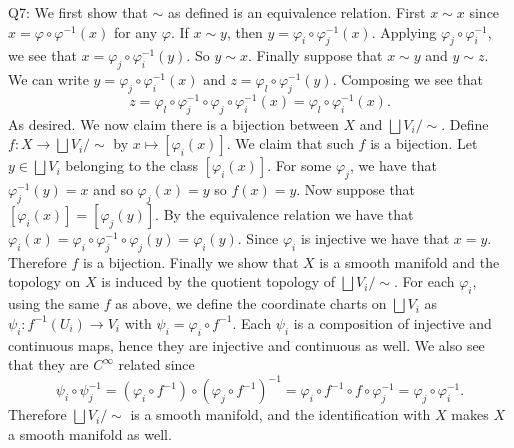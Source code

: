 \documentclass[letterpaper]{article}
\begin{document}
 
\noindent Q7: We first show that $\sim$ as defined is an equivalence relation. First $x \sim x$ since $x = \varphi \circ \varphi^{-1}(x)$ for any $\varphi$. 
If $x \sim y$, then $y = \varphi_i \circ \varphi_j^{-1} (x)$. Applying $\varphi_j \circ \varphi_i^{-1}$, we see that $x = \varphi_{j}  \circ \varphi_i^{-1}(y)$. So $y \sim x$. 
Finally suppose that $x \sim y$ and $y \sim z$. We can write $ y = \varphi_j \circ \varphi_i^{-1}(x)$ and $z = \varphi_l \circ \varphi_j^{-1}(y).$ Composing we see that
 $$z = \varphi_l \circ \varphi_j^{-1} \circ \varphi_j \circ \varphi_i^{-1}(x) = \varphi_l \circ \varphi_i^{-1}(x).$$ 
As desired. We now claim there is a bijection between $X$ and $\bigsqcup V_i / \sim$. Define $f: X \to \bigsqcup V_i / \sim$ by $x \mapsto [\varphi_i(x)]$. We claim that such $f$ is a bijection. 
Let $y \in \bigsqcup V_i$ belonging to the class $[\varphi_i(x)]$. For some $\varphi_j$, we have that $\varphi_j^{-1}(y) = x$ and so $\varphi_j(x) = y$ so $f(x) = y$. 
Now suppose that $[\varphi_i(x)] = [\varphi_j(y)]$. By the equivalence relation we have that $\varphi_i(x) = \varphi_i\circ\varphi_j^{-1}  \circ \varphi_j (y)= \varphi_i(y). $ Since $\varphi_i$ is injective we have that $x = y$. 
Therefore $f$ is a bijection. Finally we show that $X$ is a smooth manifold and the topology on $X$ is induced by
the quotient topology of $\bigsqcup V_i / \sim$. For each $\varphi_i$, using the same $f$ as above, we define the coordinate charts on $\bigsqcup V_i$ as $\psi_i: f^{-1}(U_i) \to V_i$ with $\psi_i = \varphi_i \circ f^{-1}$. Each $\psi_i$ is a composition of injective and continuous maps, 
hence they are injective and continuous as well. We also see that they are $C^\infty$ related since 
$$\psi_i \circ \psi_j^{-1} = (\varphi_i \circ f^{-1}) \circ (\varphi_j \circ f^{-1})^{-1} = \varphi_i \circ f^{-1} \circ f \circ \varphi_j^{-1} = \varphi_j \circ \varphi_i^{-1}. $$
Therefore $\bigsqcup V_i / \sim$ is a smooth manifold, and the identification with $X$ makes $X$ a smooth manifold as well. 
\end{document}
